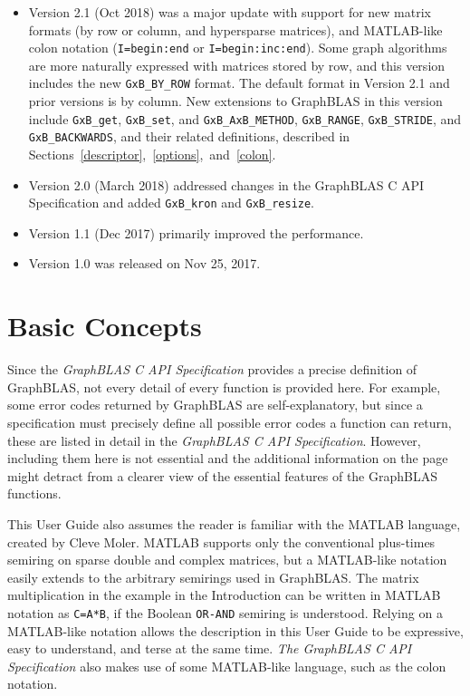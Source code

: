 \documentclass[12pt]{article}
\begin{document}
\begin{itemize}
\item
Version 2.1 (Oct 2018) was
a major update with support for new matrix formats
(by row or column, and hypersparse matrices), and MATLAB-like colon notation
(\verb'I=begin:end' or \verb'I=begin:inc:end').  Some graph algorithms are more
naturally expressed with matrices stored by row, and this version includes the
new \verb'GxB_BY_ROW' format.  The default format in Version 2.1 and
prior versions is by column.
New extensions to GraphBLAS in this version include \verb'GxB_get',
\verb'GxB_set', and \verb'GxB_AxB_METHOD', \verb'GxB_RANGE', \verb'GxB_STRIDE',
and \verb'GxB_BACKWARDS', and their related definitions, described in
Sections~\ref{descriptor},~\ref{options},~and~\ref{colon}.

\item
Version 2.0 (March 2018) addressed changes in the GraphBLAS C API
Specification and added \verb'GxB_kron' and \verb'GxB_resize'.

\item
Version 1.1 (Dec 2017) primarily improved the performance.

\item
Version 1.0 was released on Nov 25, 2017.
\end{itemize}


\newpage
\section{Basic Concepts} %
\label{basic}

Since the {\em GraphBLAS C API Specification} provides a precise definition of
GraphBLAS, not every detail of every function is provided here.  For example,
some error codes returned by GraphBLAS are self-explanatory, but since a
specification must precisely define all possible error codes a function can
return, these are listed in detail in the {\em GraphBLAS C API Specification}.
However, including them here is not essential and the additional information on
the page might detract from a clearer view of the essential features of the
GraphBLAS functions.

This User Guide also assumes the reader is familiar with the MATLAB language,
created by Cleve
Moler.  MATLAB supports only the conventional plus-times semiring on sparse
double and complex matrices, but a MATLAB-like notation easily extends to the
arbitrary semirings used in GraphBLAS.  The matrix multiplication in the
example in the Introduction can be written in MATLAB notation as \verb'C=A*B',
if the Boolean \verb'OR-AND' semiring is understood.  Relying on a MATLAB-like
notation allows the description in this User Guide to be expressive, easy to
understand, and terse at the same time.  {\em The GraphBLAS C API
Specification} also makes use of some MATLAB-like language, such as the colon
notation.
\end{document}
